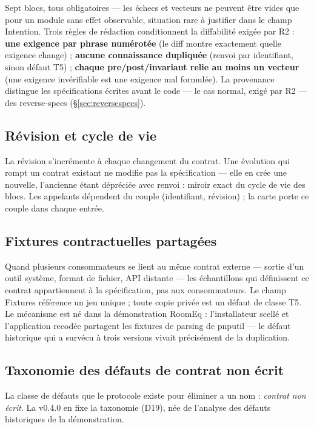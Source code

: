 Sept blocs, tous obligatoires — les échecs et vecteurs ne peuvent être vides que pour un
module sans effet observable, situation rare à justifier dans le champ Intention. Trois
règles de rédaction conditionnent la diffabilité exigée par R2 : \textbf{une exigence par
phrase numérotée} (le diff montre exactement quelle exigence change) ; \textbf{aucune
connaissance dupliquée} (renvoi par identifiant, sinon défaut T5) ; \textbf{chaque
pre/post/invariant relie au moins un vecteur} (une exigence invérifiable est une exigence
mal formulée). La provenance distingue les spécifications écrites avant le code — le cas
normal, exigé par R2 — des reverse-specs (§\ref{sec:reversespecs}).

\subsection{Révision et cycle de vie}

La révision s’incrémente à chaque changement du contrat. Une évolution qui rompt un
contrat existant ne modifie pas la spécification — elle en crée une nouvelle, l’ancienne
étant dépréciée avec renvoi : miroir exact du cycle de vie des blocs. Les appelants
dépendent du couple (identifiant, révision) ; la carte porte ce couple dans chaque entrée.

\subsection{Fixtures contractuelles partagées}

Quand plusieurs consommateurs se lient au même contrat externe — sortie d’un outil
système, format de fichier, API distante — les échantillons qui définissent ce contrat
appartiennent à la spécification, pas aux consommateurs. Le champ Fixtures référence un
jeu unique ; toute copie privée est un défaut de classe T5. Le mécanisme est né dans la
démonstration RoomEq : l’installateur scellé et l’application recodée partagent les
fixtures de parsing de pnputil — le défaut historique qui a survécu à trois versions
vivait précisément de la duplication.

\subsection{Taxonomie des défauts de contrat non écrit}\label{sec:taxonomie}

La classe de défauts que le protocole existe pour éliminer a un nom : \emph{contrat non
écrit}. La v0.4.0 en fixe la taxonomie (D19), née de l’analyse des défauts historiques de
la démonstration.

